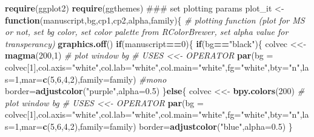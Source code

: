 \documentclass[10,portrait]{article}
\newenvironment{Shaded}{\begin{snugshade}}{\end{snugshade}}
\newcommand{\KeywordTok}[1]{\textcolor[rgb]{0.13,0.29,0.53}{\textbf{#1}}}
\newcommand{\DataTypeTok}[1]{\textcolor[rgb]{0.13,0.29,0.53}{#1}}
\newcommand{\DecValTok}[1]{\textcolor[rgb]{0.00,0.00,0.81}{#1}}
\newcommand{\FloatTok}[1]{\textcolor[rgb]{0.00,0.00,0.81}{#1}}
\newcommand{\StringTok}[1]{\textcolor[rgb]{0.31,0.60,0.02}{#1}}
\newcommand{\CommentTok}[1]{\textcolor[rgb]{0.56,0.35,0.01}{\textit{#1}}}
\newcommand{\ControlFlowTok}[1]{\textcolor[rgb]{0.13,0.29,0.53}{\textbf{#1}}}
\newcommand{\OperatorTok}[1]{\textcolor[rgb]{0.81,0.36,0.00}{\textbf{#1}}}
\newcommand{\NormalTok}[1]{#1}
\begin{document}
\begin{Shaded}
\begin{Highlighting}[]
\KeywordTok{require}\NormalTok{(ggplot2)}
\KeywordTok{require}\NormalTok{(ggthemes)}
\NormalTok{### set plotting params   }
\NormalTok{plot_it <-}\StringTok{ }\ControlFlowTok{function}\NormalTok{(manuscript,bg,cp1,cp2,alpha,family)\{ }\CommentTok{# plotting function (plot for MS or not, set bg color, set color palette from RColorBrewer, set alpha value for transperancy) }
  \KeywordTok{graphics.off}\NormalTok{()}
  \ControlFlowTok{if}\NormalTok{(manuscript}\OperatorTok{==}\DecValTok{0}\NormalTok{)\{}
    \ControlFlowTok{if}\NormalTok{(bg}\OperatorTok{==}\StringTok{"black"}\NormalTok{)\{}
\NormalTok{      colvec <<-}\StringTok{ }\KeywordTok{magma}\NormalTok{(}\DecValTok{200}\NormalTok{,}\DecValTok{1}\NormalTok{) }\CommentTok{# plot window bg # USES <<- OPERATOR}
      \KeywordTok{par}\NormalTok{(}\DataTypeTok{bg =}\NormalTok{ colvec[}\DecValTok{1}\NormalTok{],}\DataTypeTok{col.axis=}\StringTok{"white"}\NormalTok{,}\DataTypeTok{col.lab=}\StringTok{"white"}\NormalTok{,}\DataTypeTok{col.main=}\StringTok{"white"}\NormalTok{,}\DataTypeTok{fg=}\StringTok{"white"}\NormalTok{,}\DataTypeTok{bty=}\StringTok{"n"}\NormalTok{,}\DataTypeTok{las=}\DecValTok{1}\NormalTok{,}\DataTypeTok{mar=}\KeywordTok{c}\NormalTok{(}\DecValTok{5}\NormalTok{,}\DecValTok{6}\NormalTok{,}\DecValTok{4}\NormalTok{,}\DecValTok{2}\NormalTok{),}\DataTypeTok{family=}\NormalTok{family) }\CommentTok{#mono}
\NormalTok{      border=}\KeywordTok{adjustcolor}\NormalTok{(}\StringTok{"purple"}\NormalTok{,}\DataTypeTok{alpha=}\FloatTok{0.5}\NormalTok{)}
\NormalTok{    \}}\ControlFlowTok{else}\NormalTok{\{}
\NormalTok{      colvec <<-}\StringTok{ }\KeywordTok{bpy.colors}\NormalTok{(}\DecValTok{200}\NormalTok{) }\CommentTok{# plot window bg # USES <<- OPERATOR}
      \KeywordTok{par}\NormalTok{(}\DataTypeTok{bg =}\NormalTok{ colvec[}\DecValTok{1}\NormalTok{],}\DataTypeTok{col.axis=}\StringTok{"white"}\NormalTok{,}\DataTypeTok{col.lab=}\StringTok{"white"}\NormalTok{,}\DataTypeTok{col.main=}\StringTok{"white"}\NormalTok{,}\DataTypeTok{fg=}\StringTok{"white"}\NormalTok{,}\DataTypeTok{bty=}\StringTok{"n"}\NormalTok{,}\DataTypeTok{las=}\DecValTok{1}\NormalTok{,}\DataTypeTok{mar=}\KeywordTok{c}\NormalTok{(}\DecValTok{5}\NormalTok{,}\DecValTok{6}\NormalTok{,}\DecValTok{4}\NormalTok{,}\DecValTok{2}\NormalTok{),}\DataTypeTok{family=}\NormalTok{family) }
\NormalTok{      border=}\KeywordTok{adjustcolor}\NormalTok{(}\StringTok{"blue"}\NormalTok{,}\DataTypeTok{alpha=}\FloatTok{0.5}\NormalTok{)}
\NormalTok{    \}}

\end{Highlighting}
\end{Shaded}
\end{document}
